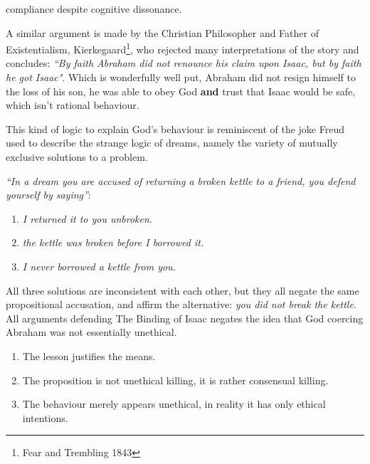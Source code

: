 \noindent
compliance despite cognitive dissonance. 

A similar argument is made by the Christian Philosopher and Father of Existentialism, Kierkegaard\footnote{Fear and Trembling 1843}, who rejected many interpretations of the story and concludes: \textit{``By faith Abraham did not renounce his claim upon Isaac, but by faith he got Isaac"}. Which is wonderfully well put, Abraham did not resign himself to the loss of his son, he was able to obey God \textbf{and} trust that Isaac would be safe, which isn't rational behaviour.

\newpage
This kind of logic to explain God's behaviour is reminiscent of the joke Freud used to describe the strange logic of dreams, namely the variety of mutually exclusive solutions to a problem. 

\begin{center}
\textit{``In a dream you are accused of returning a broken kettle to a friend, you defend yourself by saying''}:
\end{center}
\begin{enumerate}
\item \textit{I returned it to you unbroken.}
\item \textit{the kettle was broken before I borrowed it.}
\item \textit{I never borrowed a kettle from you.}
\end{enumerate}

All three solutions are inconsistent with each other, but they all negate the same propositional accusation, and affirm the alternative: \textit{you did not break the kettle}. All arguments defending The Binding of Isaac negates the idea that God coercing Abraham was not essentially unethical.%

\begin{enumerate}
\item The lesson justifies the means.
\item The proposition is not unethical killing, it is rather consensual killing.
\item The behaviour merely appears unethical, in reality it has only ethical intentions.
\end{enumerate}

